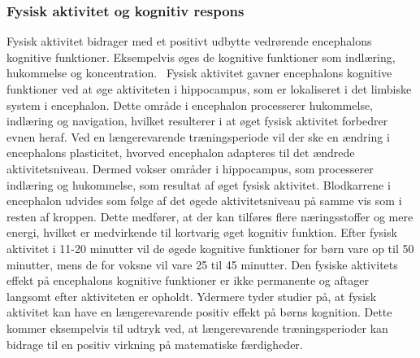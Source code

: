 \subsubsection{Fysisk aktivitet og kognitiv respons}
Fysisk aktivitet bidrager med et positivt udbytte vedrørende encephalons kognitive funktioner. Eksempelvis øges de kognitive funktioner som indlæring, hukommelse og koncentration.~\citep{Berchtold2010,Bugge2015,Schmidt2015} 
Fysisk aktivitet gavner encephalons kognitive funktioner ved at øge aktiviteten i hippocampus, som er lokaliseret i det limbiske system i encephalon. Dette område i encephalon processerer hukommelse, indlæring og navigation, hvilket resulterer i at øget fysisk aktivitet forbedrer evnen heraf. Ved en længerevarende træningsperiode vil der ske en ændring i encephalons plasticitet, hvorved encephalon adapteres til det ændrede aktivitetsniveau. Dermed vokser områder i hippocampus, som processerer indlæring og hukommelse, som resultat af øget fysisk aktivitet. Blodkarrene i encephalon udvides som følge af det øgede aktivitetsniveau på samme vis som i resten af kroppen. Dette medfører, at der kan tilføres flere næringsstoffer og mere energi, hvilket er medvirkende til kortvarig øget kognitiv funktion. 
Efter fysisk aktivitet i 11-20 minutter vil de øgede kognitive funktioner for børn vare op til 50 minutter, mens de for voksne vil vare 25 til 45 minutter. Den fysiske aktivitets effekt på encephalons kognitive funktioner er ikke permanente og aftager langsomt efter aktiviteten er opholdt. \citep{Cotman2007,Schmidt2015} Ydermere tyder studier på, at fysisk aktivitet kan have en længerevarende positiv effekt på børns kognition. Dette kommer eksempelvis til udtryk ved, at længerevarende træningsperioder kan bidrage til en positiv virkning på matematiske færdigheder. \citep{SibleyEtnier2003,Bugge2015}
